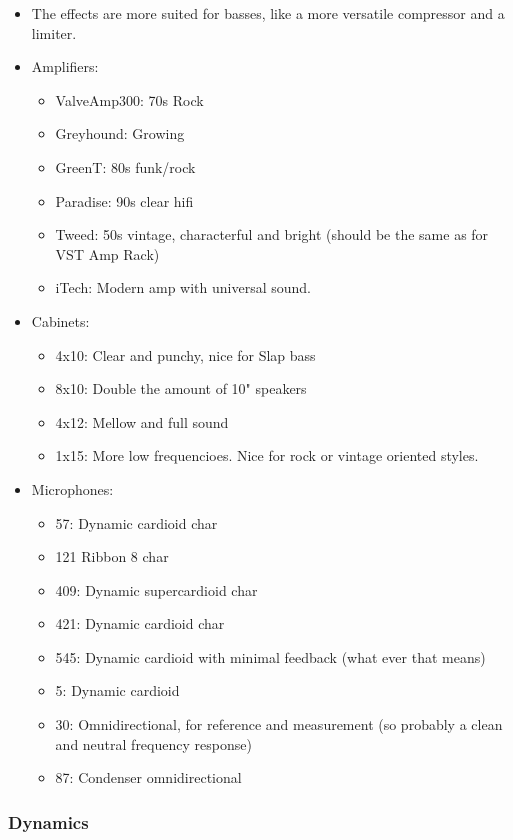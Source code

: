 \documentclass[10pt]{article}
\begin{document}
\begin{itemize}
	\item The effects are more suited for basses, like a more versatile compressor and a limiter.
	\item Amplifiers:
	\begin{itemize}
		\item ValveAmp300: 70s Rock
		\item Greyhound: Growing
		\item GreenT: 80s funk/rock
		\item Paradise: 90s clear hifi
		\item Tweed: 50s vintage, characterful and bright (should be the same as for VST Amp Rack)
		\item iTech: Modern amp with universal sound.
	\end{itemize}
	\item Cabinets:
	\begin{itemize}
		\item 4x10: Clear and punchy, nice for Slap bass
		\item 8x10: Double the amount of 10" speakers
		\item 4x12: Mellow and full sound
		\item 1x15: More low frequencioes. Nice for rock or vintage oriented styles.
	\end{itemize}
	\item Microphones:
	\begin{itemize}
		\item 57: Dynamic cardioid char
		\item 121 Ribbon 8 char
		\item 409: Dynamic supercardioid char
		\item 421: Dynamic cardioid char
		\item 545: Dynamic cardioid with minimal feedback (what ever that means)
		\item 5: Dynamic cardioid
		\item 30: Omnidirectional, for reference and measurement (so probably a clean and neutral frequency response)
		\item 87: Condenser omnidirectional
	\end{itemize}
\end{itemize}

\subsubsection{Dynamics}
\end{document}
